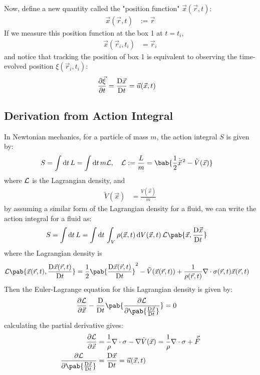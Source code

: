 Now, define a new quantity called the "position function" $\vec{x}(\vec{r}, t)$:
\begin{align}
  \vec{x}(\vec{r}, t) & := \vec{r}
\end{align}
If we measure this position function at the box 1 at $t = t_i$,
\begin{align}
  \vec{x}(\vec{r}_i, t_i) & = \vec{r}_i
\end{align}
and notice that tracking the position of box 1 is equivalent to observing the time-evolved position $\xi(\vec{r}_i, t_i)$:
\begin{align}
  \pdv{\vec{\xi}}{t} & = \mdv{\vec{x}}{t} = \vec{u}(\vec{x}, t)
\end{align}

\subsection{Derivation from Action Integral}
In Newtonian mechanics, for a particle of mass $m$, the action integral $S$ is given by:
\begin{align}
  S & = \int \odif{t} \, L = \int \odif{t} \, m \lagr, \quad \lagr := \frac{L}{m} = \bab{\frac{1}{2} \dot{\vec{x}}^{\, 2} - \tilde{V}(\vec{x})}
\end{align}
where $\mathcal{L}$ is the Lagrangian density, and
\begin{align}
  \tilde{V}(\vec{x}) & = \frac{V(\vec{x})}{m}
\end{align}
by assuming a similar form of the Lagrangian density for a fluid, we can write the action integral for a fluid as:
\begin{align}
  S & = \int \odif{t} \, L = \int \odif{t} \, \int_V \rho(\vec{x}, t) \odif{V}(\vec{x}, t) \, \lagr\pab{\vec{x}, \mdv{\vec{x}}{t}}
\end{align}
where the Lagrangian density is
\begin{align}
  \lagr \pab{\vec{x}(\vec{r}, t), \mdv{\vec{x}(\vec{r}, t)}{t}} & = \frac{1}{2} \pab{\mdv{\vec{x}(\vec{r}, t)}{t}}^2 - \tilde{V}(\vec{x}(\vec{r}, t)) + \frac{1}{\rho(\vec{r}, t)} \nabla \cdot \sigma(\vec{r}, t) \vec{x}(\vec{r}, t)
\end{align}
Then the Euler-Lagrange equation for this Lagrangian density is given by:
\begin{align}
  \pdv{\lagr}{\vec{x}} - \mdv{}{t} \pab{\pdv{\lagr}{\pab{\mdv{\vec{x}}{t}}}} & = 0
\end{align}
calculating the partial derivative gives:
\begin{align}
  \pdv{\lagr}{\vec{x}}                & = \frac{1}{\rho} \nabla \cdot \sigma - \nabla \tilde{V}(\vec{x}) = \frac{1}{\rho} \nabla \cdot \sigma + \vec{\tilde{F}} \\
  \pdv{\lagr}{\pab{\mdv{\vec{x}}{t}}} & = \mdv{\vec{x}}{t} = \vec{u}(\vec{x}, t)
\end{align}
